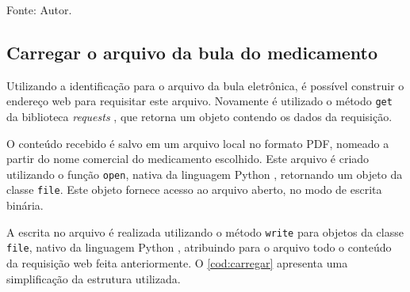 \begin{lstfloat}[htbp]
    \centering
    
    \caption*{Fonte: Autor.}
\end{lstfloat}







\subsection{Carregar o arquivo da bula do medicamento}\label{ssec:arquivo}

Utilizando a identificação para o arquivo da bula eletrônica, é possível construir o endereço web para requisitar este arquivo.
Novamente é utilizado o método \lstinline|get| da biblioteca \textit{requests} \cite{reitz2024request}, que retorna um objeto contendo os dados da requisição.

O conteúdo recebido é salvo em um arquivo local no formato \acs{PDF}, nomeado a partir do nome comercial do medicamento escolhido.
Este arquivo é criado utilizando o função \lstinline|open|, nativa da linguagem Python \cite{pythonOpen}, retornando um objeto da classe \lstinline|file|.
Este objeto fornece acesso ao arquivo aberto, no modo de escrita binária.

A escrita no arquivo é realizada utilizando o método \lstinline|write| para objetos da classe \lstinline|file|, nativo da linguagem Python \cite{pythonWrite}, atribuindo para o arquivo todo o conteúdo da requisição web feita anteriormente.
O \autoref{cod:carregar} apresenta uma simplificação da estrutura utilizada.

